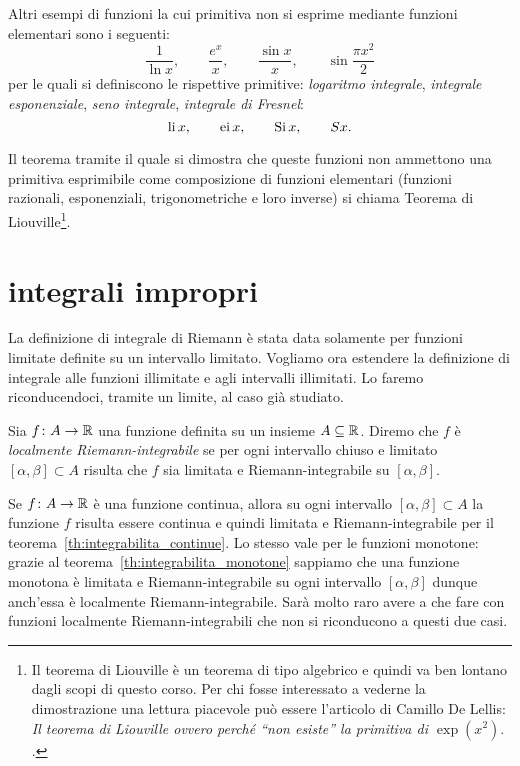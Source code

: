 Altri esempi di funzioni la cui primitiva non si esprime mediante 
funzioni elementari sono i seguenti:
\[
  \frac{1}{\ln x}, \qquad 
  \frac{e^x}{x}, \qquad
  \frac{\sin x}{x}, \qquad \sin\frac{\pi x^2}{2}
\]
per le quali si definiscono le rispettive primitive:
\emph{logaritmo integrale}, \emph{integrale esponenziale},
\emph{seno integrale},
\emph{integrale di Fresnel}:
\[
\operatorname{li} x, \qquad 
\operatorname{ei} x, \qquad 
\operatorname{Si} x, \qquad
S x.
\]

Il teorema tramite il quale si dimostra che queste 
funzioni non ammettono una primitiva esprimibile come 
composizione di funzioni elementari (funzioni razionali, 
esponenziali, trigonometriche e loro inverse) si chiama 
Teorema di Liouville\footnote{%
Il teorema di Liouville è un teorema di tipo algebrico 
e quindi va ben lontano dagli scopi di questo corso.
Per chi fosse interessato a vederne la dimostrazione 
una lettura piacevole può essere l'articolo di Camillo De Lellis: 
\emph{Il teorema di Liouville ovvero perché ``non esiste'' la primitiva
di $\exp(x^2)$}.
.
}.




\section{integrali impropri}

La definizione di integrale di Riemann è stata data solamente per funzioni
limitate definite su un intervallo
limitato.
Vogliamo ora estendere la definizione di integrale alle funzioni illimitate e
agli intervalli illimitati.
Lo faremo riconducendoci, tramite un limite, al caso già studiato.

\begin{definition}
\label{def:localmente_riemann}
Sia $f\colon A \to \mathbb R$ una funzione definita su un insieme $A\subseteq \mathbb R$.
Diremo che $f$ è \emph{localmente Riemann-integrabile} se
per ogni intervallo chiuso e limitato $[\alpha,\beta]\subset A$ risulta
che $f$ sia limitata e Riemann-integrabile su $[\alpha,\beta]$.
\end{definition}

\begin{remark}
Se $f\colon A \to \mathbb R$ è una funzione continua, allora su ogni
intervallo $[\alpha,\beta]\subset A$ la funzione $f$ risulta essere continua
e quindi limitata e Riemann-integrabile per il teorema~\ref{th:integrabilita_continue}.
Lo stesso vale per le funzioni monotone:
grazie al teorema~\ref{th:integrabilita_monotone}
sappiamo che una funzione monotona è limitata e
Riemann-integrabile su ogni intervallo $[\alpha,\beta]$ dunque anch'essa
è localmente Riemann-integrabile. Sarà molto raro avere a che fare con
funzioni localmente Riemann-integrabili che non si riconducono
a questi due casi.
\end{remark}


